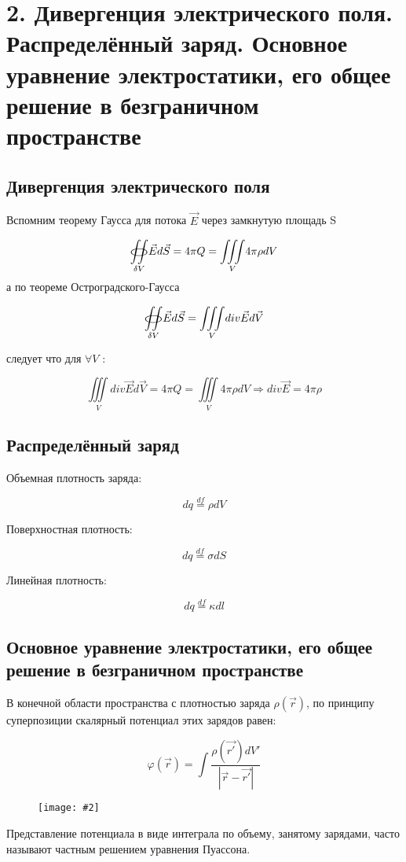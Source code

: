 \documentclass[a4paper,12pt]{article}
\newcommand{\fc}[1]{\[#1\]}
\newcommand{\oiint}{%
  \mathchoice%
    {\mathop{\raisebox{0.1ex}{\scalebox{1.7}[0.7]{\(\bigcirc\)}}}%
     \!\!\!\!\!\!\!\!\!\!\!\int\!\!\!\int}%
    {\mathop{\raisebox{0.2ex}{\scalebox{1.}[0.6]{\(\bigcirc\)}}}%
     \!\!\!\!\!\!\!\int\!\!\!\int}%
    {\mathop{\raisebox{0.1ex}{\scalebox{1}[0.8]{\(\bigcirc\)}}}%
     \!\!\!\!\!\!\!\!\!\int\!\!\!\int}%
    {\mathop{\raisebox{0.05ex}{\scalebox{0.8}[0.8]{\(\bigcirc\)}}}%
     \!\!\!\!\!\!\!\!\int\!\!\!\int}%
}
\newcommand{\imc}[2][0.7\textwidth]{%
    \begin{figure}[h!]
        \centering
        \texttt{[image: \#2]}
    \end{figure}%
}
\begin{document}
\newpage


\section*{2. Дивергенция электрического поля. Распределённый заряд. Основное
уравнение электростатики, его общее решение в безграничном пространстве}

\subsection*{Дивергенция электрического поля}

Вспомним теорему Гаусса для потока $\vec{E}$ через замкнутую площадь S

\fc{\underset{\delta V}{\oiint}\vec{E}d\vec{S}=4\pi Q= \underset{V}{\iiint}
4\pi \rho dV }
а по теореме Остроградского-Гаусса 

\fc{\underset{\delta V}{\oiint}\vec{E}d\vec{S}=\underset{V}{\iiint}div
\vec{E}d\vec{V}}

следует что для $ \forall V$ :

\fc{\underset{V}{\iiint}div \vec{E}d\vec{V}=4\pi Q= \underset{V}{\iiint} 4\pi
\rho dV\Rightarrow div\vec{E}=4\pi \rho}  

\subsection*{Распределённый заряд}

Объемная плотность заряда: 

\fc{dq\overset{df}{=}\rho dV}

Поверхностная плотность:

\fc{dq\overset{df}{=}\sigma dS}

Линейная плотность:

\fc{dq\overset{df}{=}\kappa dl}

\subsection*{Основное
уравнение электростатики, его общее решение в безграничном пространстве}

В конечной области пространства с плотностью заряда $\rho(\vec{r})$, по
принципу суперпозиции скалярный потенциал этих зарядов равен:

\fc{\varphi (\vec{r})=\int \frac{\rho(\vec{r'})dV'}{|\vec{r}-\vec{r'}|}}

\imc[0.5\textwidth]{4.png} 

Представление потенциала в виде интеграла по объему, занятому зарядами, часто
называют частным решением уравнения Пуассона.
\end{document}
